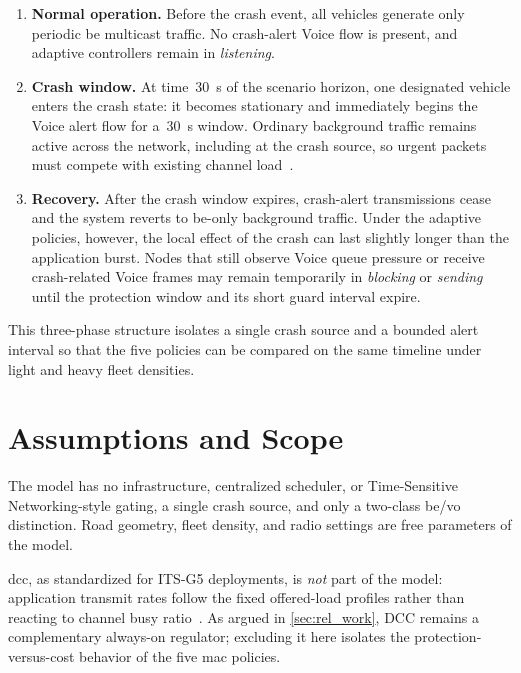 \begin{enumerate}
  \item \textbf{Normal operation.}
    Before the crash event, all vehicles generate only periodic \gls{be} multicast traffic.
    No crash-alert Voice flow is present, and adaptive controllers remain in \emph{listening}.
  \item \textbf{Crash window.}
    At time~\SI{30}{\second} of the scenario horizon, one designated vehicle enters the crash state: it becomes stationary and immediately begins the Voice alert flow for a~\SI{30}{\second} window.
    Ordinary background traffic remains active across the network, including at the crash source, so urgent packets must compete with existing channel load~\cite{RFC9119_Multicast_IEEE802_Wireless}.
  \item \textbf{Recovery.}
    After the crash window expires, crash-alert transmissions cease and the system reverts to \gls{be}-only background traffic.
    Under the adaptive policies, however, the local effect of the crash can last slightly longer than the application burst.
    Nodes that still observe Voice queue pressure or receive crash-related Voice frames may remain temporarily in \emph{blocking} or \emph{sending} until the protection window and its short guard interval expire.
\end{enumerate}

This three-phase structure isolates a single crash source and a bounded alert interval so that the five policies can be compared on the same timeline under light and heavy fleet densities.

\section{Assumptions and Scope}
\label{sec:sys:scope}

The model has no infrastructure, centralized scheduler, or Time-Sensitive Networking-style gating, a single crash source, and only a two-class \gls{be}/\gls{vo} distinction.
Road geometry, fleet density, and radio settings are free parameters of the model.

\gls{dcc}, as standardized for ITS-G5 deployments, is \emph{not} part of the model: application transmit rates follow the fixed offered-load profiles rather than reacting to channel busy ratio~\cite{etsi_dcc_2018}.
As argued in \autoref{sec:rel_work}, DCC remains a complementary always-on regulator; excluding it here isolates the protection-versus-cost behavior of the five \gls{mac} policies.

